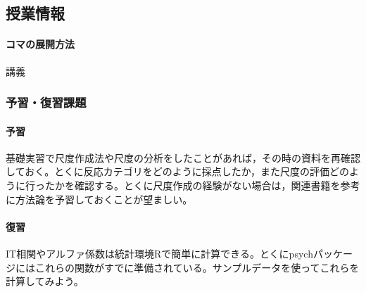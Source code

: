 \subsection{授業情報}
\paragraph{コマの展開方法}
講義
\subsubsection{予習・復習課題}
\paragraph{予習}基礎実習で尺度作成法や尺度の分析をしたことがあれば，その時の資料を再確認しておく。とくに反応カテゴリをどのように採点したか，また尺度の評価どのように行ったかを確認する。とくに尺度作成の経験がない場合は，関連書籍\textcite{Miyatani2009}を参考に方法論を予習しておくことが望ましい。
\paragraph{復習}IT相関やアルファ係数は統計環境Rで簡単に計算できる。とくにpsychパッケージにはこれらの関数がすでに準備されている。サンプルデータを使ってこれらを計算してみよう。
